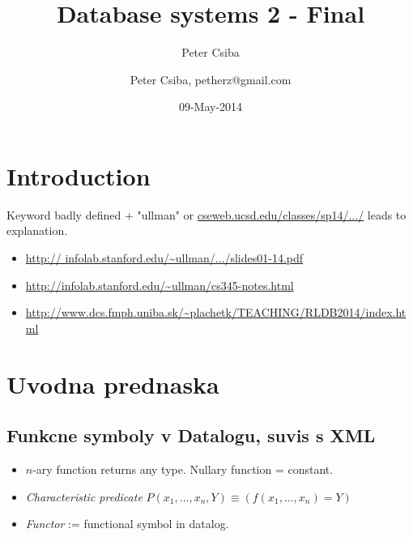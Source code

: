 \documentclass[12pt,a4paper]{article}
\author{Peter Csiba}
\title{Database systems 2 - Final}
\date{09-May-2014}
\author{Peter Csiba, petherz@gmail.com}
\begin{document}
\maketitle

\section{Introduction}
Keyword badly defined + "ullman" or \url{cseweb.ucsd.edu/classes/sp14/.../} leads to explanation. 

\begin{itemize} 
\item \url{http:// infolab.stanford.edu/~ullman/.../slides01-14.pdf} 
\item \url{http://infolab.stanford.edu/~ullman/cs345-notes.html}
\item \url{http://www.dcs.fmph.uniba.sk/~plachetk/TEACHING/RLDB2014/index.html} 
\end{itemize} 

\section{Uvodna prednaska}

\subsection{Funkcne symboly v Datalogu, suvis s XML}
\begin{itemize} 
\item $n$-ary function returns any type. Nullary function = constant. 
\item \emph{Characteristic predicate} $P(x_1,\ldots,x_n, Y) \equiv \left(f(x_1, \ldots, x_n) = Y\right)$
\item \emph{Functor} := functional symbol in datalog. 
\end{itemize} 
\end{document}
